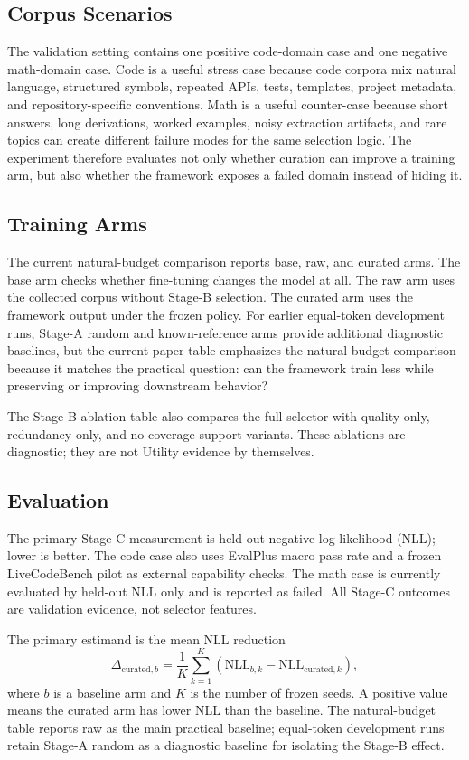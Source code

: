 \documentclass[conference]{IEEEtran}
\begin{document}
\subsection{Corpus Scenarios}
The validation setting contains one positive code-domain case and one negative
math-domain case.  Code is a useful stress case because code corpora mix
natural language, structured symbols, repeated APIs, tests, templates, project
metadata, and repository-specific conventions.  Math is a useful counter-case
because short answers, long derivations, worked examples, noisy extraction
artifacts, and rare topics can create different failure modes for the same
selection logic.  The experiment therefore evaluates not only whether curation
can improve a training arm, but also whether the framework exposes a failed
domain instead of hiding it.

\subsection{Training Arms}
The current natural-budget comparison reports base, raw, and curated arms.  The
base arm checks whether fine-tuning changes the model at all.  The raw arm
uses the collected corpus without Stage-B selection.  The curated arm uses the
framework output under the frozen policy.  For earlier equal-token development
runs, Stage-A random and known-reference arms provide additional diagnostic
baselines, but the current paper table emphasizes the natural-budget
comparison because it matches the practical question: can the framework train
less while preserving or improving downstream behavior?

The Stage-B ablation table also compares the full selector with quality-only,
redundancy-only, and no-coverage-support variants.  These ablations are
diagnostic; they are not Utility evidence by themselves.

\subsection{Evaluation}
The primary Stage-C measurement is held-out negative log-likelihood (NLL);
lower is better.  The code case also uses EvalPlus macro pass rate and a frozen
LiveCodeBench pilot as external capability checks.  The math case is currently
evaluated by held-out NLL only and is reported as failed.  All Stage-C outcomes
are validation evidence, not selector features.

The primary estimand is the mean NLL reduction
\begin{equation}
\Delta_{\mathrm{curated},b}=\frac{1}{K}\sum_{k=1}^{K}
\left(\mathrm{NLL}_{b,k}-\mathrm{NLL}_{\mathrm{curated},k}\right),
\end{equation}
where $b$ is a baseline arm and $K$ is the number of frozen seeds.  A positive
value means the curated arm has lower NLL than the baseline.  The natural-budget
table reports raw as the main practical baseline; equal-token development runs
retain Stage-A random as a diagnostic baseline for isolating the Stage-B effect.
\end{document}
